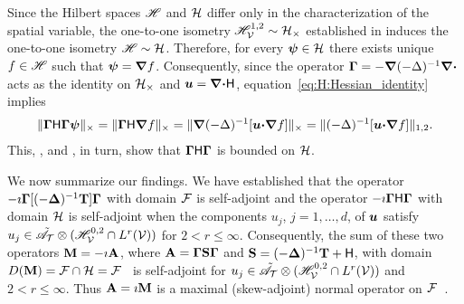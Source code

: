 \documentclass[amsa]{ipart}
\begin{document}
Since the Hilbert spaces $\mathscr{H}$ and $\mathcal{H}$ differ only in
the characterization of the spatial variable, the one-to-one isometry
$\mathscr{H}^{1,2}_{\mathcal{V}}\sim\mathcal{H}_\times$ established in 
induces the one-to-one isometry $\mathscr{H}\sim\mathcal{H}$. Therefore, for every
$\mbox{\boldmath${\psi}$}\in\mathcal{H}$ there exists unique $f\in\mathscr{H}$ such that $\boldsymbol{\psi}=\mbox{\boldmath${\nabla}$} f$.
Consequently, since the operator
$\mbox{\boldmath${\Gamma}$}=-\mbox{\boldmath${\nabla}$}(-\Delta)^{-1}\mbox{\boldmath${\nabla}$}\mbox{\boldmath${\cdot}$}$ acts as the identity on
$\mathcal{H}_\times$ and $\boldsymbol{u}=\mbox{\boldmath${\nabla}$}\mbox{\boldmath${\cdot}$}\mathsf{H}$,
equation~\eqref{eq:H:Hessian_identity} implies   
%
\begin{align}
  \|\bGamma\Hm\bGamma\bpsi\|_\times
  =\|\bGamma\Hm\bnabla f\|_\times
  =\|\bnabla(-\Delta)^{-1}[\vecu\bcdot\bnabla f]\|_\times
  =\|(-\Delta)^{-1}[\vecu\bcdot\bnabla f]\|_{1,2}.
\end{align}
%
This, , and , in
turn, show that $\mbox{\boldmath${\Gamma}$}\mathsf{H}\mbox{\boldmath${\Gamma}$}$ is bounded on $\mathcal{H}$. 



We now summarize our findings. We have established that the operator
$-\imath\mbox{\boldmath${\Gamma}$}[(-\mbox{\boldmath${\Delta}$})^{-1}\mathbf{T}]\mbox{\boldmath${\Gamma}$}$ with domain $\mathcal{F}$ is
self-adjoint and the operator $-\imath\mbox{\boldmath${\Gamma}$}\mathsf{H}\mbox{\boldmath${\Gamma}$}$ with domain $\mathcal{H}$
is self-adjoint when the components $u_j$, $j=1,\ldots,d$, of $\boldsymbol{u}$
satisfy $u_j\in\tilde{\mathscr{A}}_{\mathcal{T}}\otimes (\mathscr{H}^{0,2}_{\mathcal{V}}\cap L^r(\mathcal{V}))$ for
$2<r\leq\infty$. Consequently, the sum  of these two operators
$\mathbf{M}=-\imath\mathbf{A}$, where $\mathbf{A}=\mbox{\boldmath${\Gamma}$}\mathbf{S}\mbox{\boldmath${\Gamma}$}$ and
$\mathbf{S}=(-\mbox{\boldmath${\Delta}$})^{-1}\mathbf{T}+\mathsf{H}$, with domain
$D(\mathbf{M})=\mathcal{F}\cap\mathcal{H}=\mathcal{F}$~\cite{Stone:64} is self-adjoint for
$u_j\in\tilde{\mathscr{A}}_{\mathcal{T}}\otimes (\mathscr{H}^{0,2}_{\mathcal{V}}\cap L^r(\mathcal{V}))$ and $2<r\leq\infty$. Thus
$\mathbf{A}=\imath \mathbf{M}$ is a maximal (skew-adjoint) normal operator on
$\mathcal{F}$~\cite{Stone:64}.            
\end{document}
